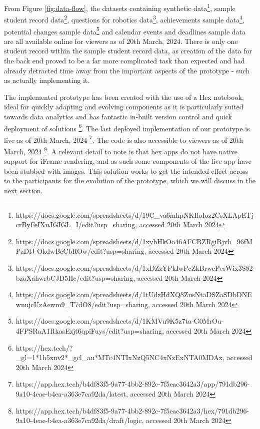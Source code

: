 \documentclass{l4proj}
\begin{document}
From Figure \ref{fig:data-flow}, the datasets containing synthetic data\footnote{https://docs.google.com/spreadsheets/d/19C_va6mhpNKIloIoz2CsXLApETjcrByFeIXuJGIGL_I/edit?usp=sharing, accessed 20th March 2024}, sample student record data\footnote{https://docs.google.com/spreadsheets/d/1xybHkOo46AFCRZRgiRjvh_96fMPzDlJ-OkdwBcCbROw/edit?usp=sharing, accessed 20th March 2024}, questions for robotics data\footnote{https://docs.google.com/spreadsheets/d/1xDZzYPkIwPcZkBrwcPesWix3S82-bzoXahwrbCJD5Hc/edit?usp=sharing, accessed 20th March 2024}, achievements sample data\footnote{https://docs.google.com/spreadsheets/d/1tUdzHdXQ8ZusNtaDSZaSDbDNEwnujcUzAewm9_T7dO8/edit?usp=sharing, accessed 20th March 2024}, potential changes sample data\footnote{https://docs.google.com/spreadsheets/d/1KMVu9K5z7ta-G0MrOu-4FPSRaA1RkasEzjt6qpiFuys/edit?usp=sharing, accessed 20th March 2024} and calendar events and deadlines sample data are all available online for viewers as of 20th March, 2024. There is only one student record within the sample student record data, as creation of the data for the back end proved to be a far more complicated task than expected and had already detracted time away from the important aspects of the prototype - such as actually implementing it.   

The implemented prototype has been created with the use of a Hex notebook, ideal for quickly adapting and evolving components as it is particularly suited towards data analytics and has fantastic in-built version control and quick deployment of solutions \footnote{https://hex.tech/?_gl=1*1h5xnv2*_gcl_au*MTc4NTIxNzQ5NC4xNzExNTA0MDAx, accessed 20th March 2024}. The last deployed implementation of our prototype is live as of 20th March, 2024 \footnote{https://app.hex.tech/b4df83f5-9a77-4bb2-892c-7f5eac3642a3/app/791db296-9a10-4eae-b4ea-a363e7ca92da/latest, accessed 20th March 2024}. The code is also accessible to viewers as of 20th March, 2024 \footnote{https://app.hex.tech/b4df83f5-9a77-4bb2-892c-7f5eac3642a3/hex/791db296-9a10-4eae-b4ea-a363e7ca92da/draft/logic, accessed 20th March 2024}. A relevant detail to note is that hex apps do not have native support for iFrame rendering, and as such some components of the live app have been stubbed with images. This solution works to get the intended effect across to the participants for the evolution of the prototype, which we will discuss in the next section. 




\end{document}
